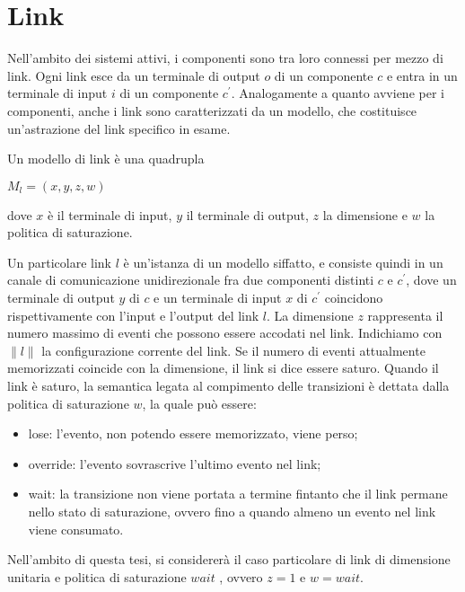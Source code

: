 \section{Link}
Nell'ambito dei sistemi attivi, i componenti sono tra loro connessi per mezzo di link. Ogni link esce da un terminale di output $o$ di un componente $c$ e entra in un terminale di input $i$ di un componente $c^\prime$.
Analogamente a quanto avviene per i componenti, anche i link sono caratterizzati da un modello, che costituisce un'astrazione del link specifico in esame.

\begin{defn}
Un modello di link è una quadrupla
\begin{center}
	$M_l = (x,y,z,w)$
\end{center}
dove $x$ è il terminale di input, $y$ il terminale di output, $z$ la dimensione e $w$ la politica di saturazione.
\end{defn}
Un particolare link $l$ è un'istanza di un modello siffatto, e consiste quindi in un canale di comunicazione unidirezionale fra due componenti distinti $c$ e $c^\prime$, dove un terminale di output $y$ di $c$ e un terminale di input $x$ di $c^\prime$ coincidono rispettivamente con l'input e l'output del link $l$.
La dimensione $z$ rappresenta il numero massimo di eventi che possono essere accodati nel link. 
Indichiamo con $\parallel l \parallel$ la configurazione corrente del link. 
Se il numero di eventi attualmente memorizzati coincide con la dimensione, il link si dice essere saturo.
Quando il link è saturo, la semantica legata al compimento delle transizioni è dettata dalla politica di saturazione $w$, la quale può essere:
\begin{itemize}
\item lose: l'evento, non potendo essere memorizzato, viene perso;
\item override: l'evento sovrascrive l'ultimo evento nel link;
\item wait: la transizione non viene portata a termine fintanto che il link permane nello stato di saturazione, ovvero fino a quando almeno un evento nel link viene consumato.
\end{itemize}
Nell'ambito di questa tesi, si considererà il caso particolare di link di dimensione unitaria e politica di saturazione $wait$ , ovvero $z = 1$ e $w = wait$.

